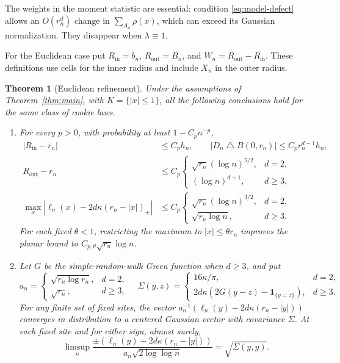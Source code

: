 \documentclass[11pt]{amsart}
\theoremstyle{plain}
\newtheorem{theorem}{Theorem}[section]
\theoremstyle{definition}
\numberwithin{equation}{section}
\newcommand{\ind}{\mathbf1}
\newcommand{\Rin}{R_{\mathrm{in}}}
\newcommand{\Rout}{R_{\mathrm{out}}}
\begin{document}
The weights in the moment statistic are essential: condition
\eqref{eq:model-defect} allows an $O(r_n^d)$ change in
$\sum_{A_n}\rho(x)$, which can exceed its Gaussian normalization.
They disappear when $\lambda\equiv1$.

For the Euclidean case put $\Rin=b_n$, $\Rout=B_n$, and
$W_n=\Rout-\Rin$. These definitions use cells for the inner radius
and include $X_n$ in the outer radius.

\begin{theorem}[Euclidean refinement]\label{thm:radial}
Under the assumptions of Theorem~\ref{thm:main}, with $K=\{|x|\le1\}$,
all the following conclusions hold for the same class of cookie laws.
\begin{enumerate}[label=\textup{(\roman*)},leftmargin=*]
\item For every $p>0$, with probability at least $1-C_pn^{-p}$,
\begin{align}
 |\Rin-r_n|&\le C_ph_n,\qquad
 |D_n\mathbin\triangle B(0,r_n)|\le C_pr_n^{d-1}h_n,
 \label{eq:radial-inner}\\
 \Rout-r_n&\le C_p\begin{cases}
 \sqrt{r_n}(\log n)^{5/2},&d=2,\\
 (\log n)^{d+1},&d\ge3,
 \end{cases}\label{eq:radial-outer}\\
 \max_x|\ell_n(x)-2d\kappa(r_n-|x|)_+|
 &\le C_p\begin{cases}
 \sqrt{r_n}(\log n)^{3/2},&d=2,\\
 \sqrt{r_n\log n},&d\ge3.
 \end{cases}\label{eq:radial-profile}
\end{align}
For each fixed $\theta<1$, restricting the maximum to
$|x|\le\theta r_n$ improves the planar bound to
$C_{p,\theta}\sqrt{r_n}\log n$.

\item Let $G$ be the simple-random-walk Green function when $d\ge3$,
and put
\[
 a_n=\begin{cases}\sqrt{r_n\log r_n},&d=2,\\
 \sqrt{r_n},&d\ge3,
 \end{cases}\quad
 \Sigma(y,z)=\begin{cases}16\kappa/\pi,&d=2,\\
 2d\kappa(2G(y-z)-\ind_{\{y=z\}}),&d\ge3.
 \end{cases}
\]
For any finite set of fixed sites, the vector
$a_n^{-1}(\ell_n(y)-2d\kappa(r_n-|y|))$ converges in distribution
to a centered Gaussian vector with covariance $\Sigma$.
At each fixed site and for either sign, almost surely,
\begin{equation}\label{eq:radial-site-lil}
 \limsup_n\frac{\pm(\ell_n(y)-2d\kappa(r_n-|y|))}
 {a_n\sqrt{2\log\log n}}=\sqrt{\Sigma(y,y)}.
\end{equation}


\end{enumerate}
\end{theorem}
\end{document}

